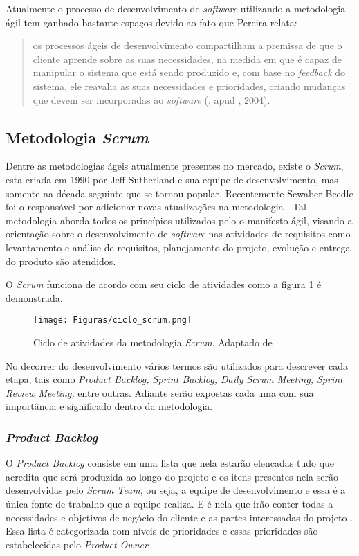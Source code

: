 {{Atualmente o processo de desenvolvimento de \textit{software} utilizando a metodologia ágil tem ganhado bastante espaços devido ao fato que Pereira \cite{2013:Pereira} relata:
\begin{quote}
    os processos ágeis de desenvolvimento compartilham a premissa de que o cliente aprende sobre as suas necessidades, na medida em que é capaz de manipular o sistema que está sendo produzido e, com base no \textit{feedback} do sistema, ele reavalia as suas necessidades e prioridades, criando mudanças que devem ser incorporadas ao \textit{software} (\cite{2013:Pereira}, apud \cite{2004:Teles}, 2004). 
\end{quote}

\subsection{Metodologia \textit{Scrum}}
\noindent Dentre as metodologias ágeis atualmente presentes no mercado, existe o \textit{Scrum}, esta criada em 1990 por Jeff Sutherland e sua equipe de desenvolvimento, mas somente na década seguinte que se tornou popular. Recentemente Scwaber Beedle foi o responsável por adicionar novas atualizações na metodologia \cite{2001:Pressman}. Tal metodologia aborda todos os princípios utilizados pelo o manifesto ágil, visando a orientação sobre o desenvolvimento de \textit{software} nas atividades de requisitos como levantamento e análise de requisitos, planejamento do projeto, evolução e entrega do produto são atendidos.

O \textit{Scrum} funciona de acordo com seu ciclo de atividades como a figura \ref{chave_para_refencia_cruzada} é demonstrada.

\begin{figure}[!hb]
  \centering 
  \texttt{[image: Figuras/ciclo\_scrum.png]}
  \caption{Ciclo de atividades da metodologia \textit{Scrum}. Adaptado de \cite{0000:rafael}}
  \label{chave_para_refencia_cruzada}
\end{figure}

No decorrer do desenvolvimento vários termos são utilizados para descrever cada etapa, tais como \textit{Product Backlog, Sprint Backlog, Daily Scrum Meeting, Sprint Review Meeting,} entre outras. Adiante serão expostas cada uma com sua importância e significado dentro da metodologia.

\subsubsection{\textit{Product Backlog}}
\noindent O \textit{Product Backlog} consiste em uma lista que nela estarão elencadas tudo que acredita que será produzida ao longo do projeto e os itens presentes nela serão desenvolvidas pelo \textit{Scrum Team}, ou seja, a equipe de desenvolvimento e essa é a única fonte de trabalho que a equipe realiza. E é nela que irão conter todas a necessidades e objetivos de negócio do cliente e as partes interessadas do projeto \cite{0000:rafael}. Essa lista é categorizada com níveis de prioridades e essas prioridades são estabelecidas pelo \textit{Product Owner}.

}}
